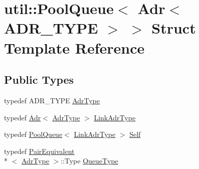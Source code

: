 \hypertarget{structutil_1_1PoolQueue_3_01Adr_3_01ADR__TYPE_01_4_01_4}{\section{util\-:\-:Pool\-Queue$<$ Adr$<$ A\-D\-R\-\_\-\-T\-Y\-P\-E $>$ $>$ Struct Template Reference}
\label{structutil_1_1PoolQueue_3_01Adr_3_01ADR__TYPE_01_4_01_4}
}
\subsection*{Public Types}
\begin{DoxyCompactItemize}
\item 
typedef A\-D\-R\-\_\-\-T\-Y\-P\-E \hyperlink{structutil_1_1PoolQueue_3_01Adr_3_01ADR__TYPE_01_4_01_4_a38ac7f747c36631995a73845c63593b3}{Adr\-Type}
\item 
typedef \hyperlink{structutil_1_1Adr}{Adr}$<$ \hyperlink{structutil_1_1PoolQueue_3_01Adr_3_01ADR__TYPE_01_4_01_4_a38ac7f747c36631995a73845c63593b3}{Adr\-Type} $>$ \hyperlink{structutil_1_1PoolQueue_3_01Adr_3_01ADR__TYPE_01_4_01_4_a6a40a095e6f1bc5fabe6651ac01da837}{Link\-Adr\-Type}
\item 
typedef \hyperlink{structutil_1_1PoolQueue}{Pool\-Queue}$<$ \hyperlink{structutil_1_1PoolQueue_3_01Adr_3_01ADR__TYPE_01_4_01_4_a6a40a095e6f1bc5fabe6651ac01da837}{Link\-Adr\-Type} $>$ \hyperlink{structutil_1_1PoolQueue_3_01Adr_3_01ADR__TYPE_01_4_01_4_a64eb6d023f5a3439af870e073f7f39cf}{Self}
\item 
typedef \hyperlink{structutil_1_1PairEquivalent}{Pair\-Equivalent}\\*
$<$ \hyperlink{structutil_1_1PoolQueue_3_01Adr_3_01ADR__TYPE_01_4_01_4_a38ac7f747c36631995a73845c63593b3}{Adr\-Type} $>$\-::Type \hyperlink{structutil_1_1PoolQueue_3_01Adr_3_01ADR__TYPE_01_4_01_4_a4fcdebc8e6fe82133f13bd6eca5b3034}{Queue\-Type}
\end{DoxyCompactItemize}
